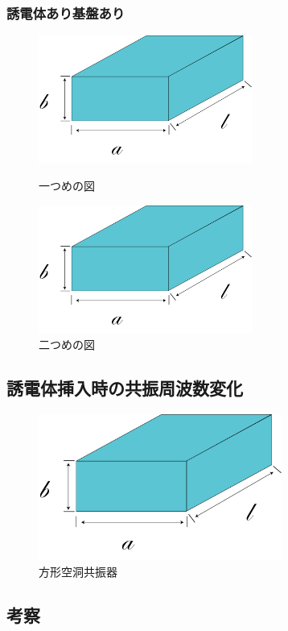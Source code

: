 \subsubsection{誘電体あり基盤あり}
\begin{figure}[h]
 \begin{minipage}{0.5\hsize}
  \begin{center}
   \includegraphics[width=70mm]{./image/空洞共振器.png}
  \end{center}
  \caption{一つめの図}
  \label{fig:one}
 \end{minipage}
 \begin{minipage}{0.5\hsize}
  \begin{center}
   \includegraphics[width=70mm]{./image/空洞共振器.png}
  \end{center}
  \caption{二つめの図}
  \label{fig:two}
 \end{minipage}
\end{figure}

\subsection{誘電体挿入時の共振周波数変化}

\vspace{10 mm}

\begin{figure}[h]
  \begin{center}
    \includegraphics[width=8cm]{./image/空洞共振器.png}
    \caption{方形空洞共振器}
    \label{fig:Cavity}
  \end{center}
\end{figure}

\subsection{考察}
